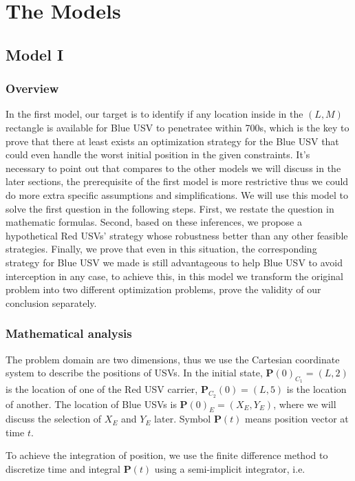 \documentclass{mcmthesis}
\begin{document}
\section{The Models}

\subsection{Model I}

\subsubsection{Overview}
In the first model, our target is to identify if any location inside in the $(L, M)$ rectangle is available for Blue USV to penetratee within 700s, which is the key to prove that there at least exists an optimization strategy for the Blue USV that could even handle the worst initial position in the given constraints. It's necessary to point out that compares to the other models we will discuss in the later sections, the prerequisite of the first model is more restrictive thus we could do more extra specific assumptions and simplifications. We will use this model to solve the first question in the following steps. First, we restate the question in mathematic formulas. Second, based on these inferences, we propose a hypothetical Red USVs' strategy whose robustness better than any other feasible strategies. Finally, we prove that even in this situation, the corresponding strategy for Blue USV we made is still advantageous to help Blue USV to avoid interception in any case, to achieve this, in this model we transform the original problem into two different optimization problems, prove the validity of our conclusion separately.

\subsubsection{Mathematical analysis}
The problem domain are two dimensions, thus we use the Cartesian coordinate system to describe the positions of USVs. In the initial state, $\mathbf{P}(0)_{C_1}=(L, 2)$ is the location of one of the Red USV carrier, $\mathbf{P}_{C_2}(0)=(L, 5)$ is the location of another. The location of Blue USVs is $\mathbf{P}(0)_{E}=(X_E, Y_E)$, where we will discuss the selection of $X_E$ and $Y_E$ later. Symbol $\mathbf{P}(t)$ means position vector at time $t$. \par
To achieve the integration of position, we use the finite difference method to discretize time and integral $\mathbf{P}(t)$ using a semi-implicit integrator, i.e.
\end{document}
